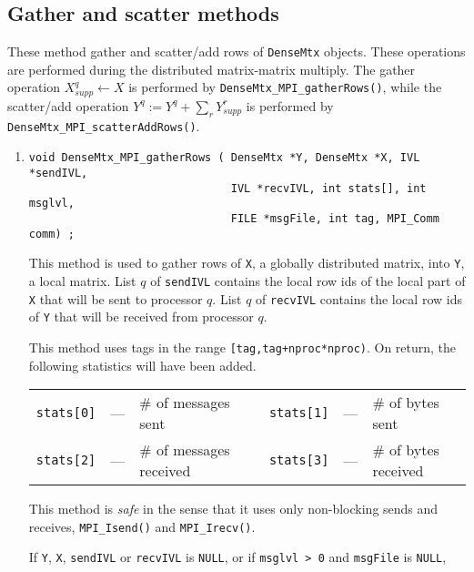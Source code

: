 \subsection{Gather and scatter methods}
\label{subsection:MPI:proto:gather-scatter}
\par
These method gather and scatter/add rows of {\tt DenseMtx} objects.
These operations are performed during the distributed matrix-matrix
multiply.
The gather operation $X_{supp}^q \leftarrow X$ is performed by
{\tt DenseMtx\_MPI\_gatherRows()},
while the scatter/add operation $Y^q := Y^q + \sum_r Y_{supp}^r$
is performed by {\tt DenseMtx\_MPI\_scatterAddRows()}.
\par
\begin{enumerate}
\item
\begin{verbatim}
void DenseMtx_MPI_gatherRows ( DenseMtx *Y, DenseMtx *X, IVL *sendIVL, 
                               IVL *recvIVL, int stats[], int msglvl, 
                               FILE *msgFile, int tag, MPI_Comm comm) ;
\end{verbatim}
This method is used to gather rows of {\tt X}, a globally
distributed matrix, into {\tt Y}, a local matrix.
List $q$ of {\tt sendIVL} contains the local row ids of the local
part of {\tt X} that will be sent to processor $q$.
List $q$ of {\tt recvIVL} contains the local row ids of {\tt Y}
that will be received from processor $q$.
\par
This method uses tags in the range {\tt [tag,tag+nproc*nproc)}.
On return, the following statistics will have been added.
\begin{center}
\begin{tabular}{cclcccl}
{\tt stats[0]} & --- & \# of messages sent 
& &
{\tt stats[1]} & --- & \# of bytes sent \\
{\tt stats[2]} & --- & \# of messages received 
& &
{\tt stats[3]} & --- & \# of bytes received 
\end{tabular}
\end{center}
This method is {\it safe} in the sense that it uses only
non-blocking sends and receives, 
{\tt MPI\_Isend()} and {\tt MPI\_Irecv()}.
\par {}
If {\tt Y}, {\tt X}, {\tt sendIVL} 
or {\tt recvIVL} is {\tt NULL}, 
or if {\tt msglvl > 0} and {\tt msgFile} is {\tt NULL},

\end{enumerate}
